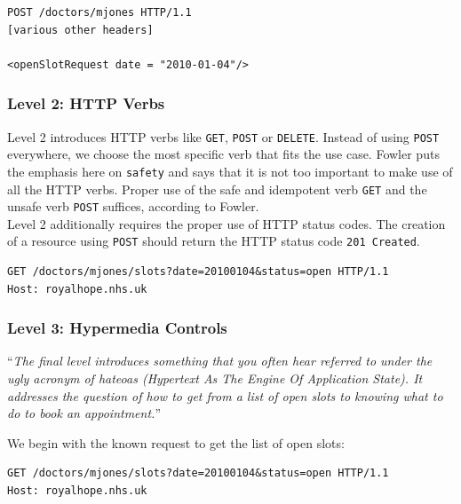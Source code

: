 \lstset{language=XML}
\begin{lstlisting}[caption=Level 1: Referring to the doctor as a resource.]
POST /doctors/mjones HTTP/1.1
[various other headers]

<openSlotRequest date = "2010-01-04"/>
\end{lstlisting}

\subsubsection{Level 2: HTTP Verbs}
Level 2 introduces HTTP verbs like \lstinline{GET}, \lstinline{POST} or \lstinline{DELETE}. Instead of using \lstinline{POST} everywhere, we choose the most specific verb that fits the use case.
Fowler puts the emphasis here on \lstinline{safety} and says that it is not too important to make use of all the HTTP verbs. Proper use of the safe and idempotent verb \lstinline{GET} and the unsafe verb \lstinline{POST} suffices, according to Fowler. \citep{richardsonmaturitymodel} \\
Level 2 additionally requires the proper use of HTTP status codes. The creation of a resource using \lstinline{POST} should return the HTTP status code \lstinline{201 Created}.

\lstset{language=XML}
\begin{lstlisting}[caption=Level 2: Safely fetching the list of open slots using \lstinline{GET}.]
GET /doctors/mjones/slots?date=20100104&status=open HTTP/1.1
Host: royalhope.nhs.uk
\end{lstlisting}

\subsubsection{Level 3: Hypermedia Controls}
``\textit{The final level introduces something that you often hear referred to under the ugly acronym of \gls{hateoas} (Hypertext As The Engine Of Application State). It addresses the question of how to get from a list of open slots to knowing what to do to book an appointment.}'' \citep{richardsonmaturitymodel}

We begin with the known request to get the list of open slots:

\lstset{language=XML}
\begin{lstlisting}[caption=Fetching the list of open slots.]
GET /doctors/mjones/slots?date=20100104&status=open HTTP/1.1
Host: royalhope.nhs.uk
\end{lstlisting}

